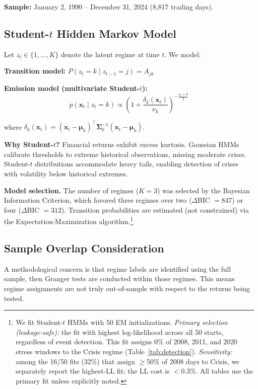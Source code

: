 \documentclass{uai2026}
\begin{document}
\textbf{Sample:} January 2, 1990 -- December 31, 2024 (8,817 trading days).

\subsection{Student-\texorpdfstring{$t$}{t} Hidden Markov Model}
\label{sec:hmm}

Let $z_t \in \{1, \ldots, K\}$ denote the latent regime at time $t$. We model:

\textbf{Transition model:}
$P(z_t = k \mid z_{t-1} = j) = A_{jk}$

\textbf{Emission model (multivariate Student-$t$):}
\begin{equation}
p(\mathbf{x}_t \mid z_t = k) \propto \left(1 + \frac{\delta_k(\mathbf{x}_t)}{\nu_k}\right)^{-\frac{\nu_k+d}{2}}
\end{equation}

where $\delta_k(\mathbf{x}_t) = (\mathbf{x}_t - \boldsymbol{\mu}_k)^\top\boldsymbol{\Sigma}_k^{-1}(\mathbf{x}_t - \boldsymbol{\mu}_k)$.

\textbf{Why Student-$t$?} Financial returns exhibit excess kurtosis. Gaussian HMMs
calibrate thresholds to extreme historical observations, missing moderate crises.
Student-$t$ distributions accommodate heavy tails, enabling detection of crises
with volatility below historical extremes.

\textbf{Model selection.} The number of regimes ($K=3$) was selected by the Bayesian
Information Criterion, which favored three regimes over two ($\Delta$BIC $= 847$) or
four ($\Delta$BIC $= 312$). Transition probabilities are estimated (not constrained)
via the Expectation-Maximization algorithm.\footnote{We fit Student-$t$ HMMs
with 50 EM initializations.
\emph{Primary selection (leakage-safe):} the fit with highest log-likelihood
across all 50 starts, regardless of event detection. This fit assigns 0\% of
2008, 2011, and 2020 stress windows to the Crisis regime (Table~\ref{tab:detection}).
\emph{Sensitivity:} among the 16/50 fits (32\%) that assign $\geq$50\% of 2008
days to Crisis, we separately report the highest-LL fit; the LL cost is $<$0.3\%.
All tables use the primary fit unless explicitly noted.}

\subsection{Sample Overlap Consideration}
\label{sec:overlap}

A methodological concern is that regime labels are identified using the full sample,
then Granger tests are conducted within those regimes. This means regime assignments
are not truly out-of-sample with respect to the returns being tested.
\end{document}
